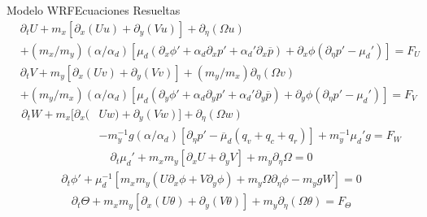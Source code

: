 \documentclass[mathserif,10pt]{beamer}
\begin{document}
\begin{frame}{Modelo WRF}{Ecuaciones Resueltas}
	\small
	\begin{equation}\begin{split}\label{eq:04_wrf1}
	&\partial_t U + m_x[\partial_x(Uu)+\partial_y(Vu)]+\partial_\eta(\Omega u) \\
	&+ (m_x/m_y)(\alpha/\alpha_d)[\mu_d(\partial_x\phi' + \alpha_d \partial_x p' + \alpha_d'\partial_x \overline p)+\partial_x\phi(\partial_\eta p' - \mu_d')] = F_U
	\end{split}\end{equation}
	\begin{equation}\begin{split}
	&\partial_t V + m_y[\partial_x(Uv)+\partial_y(Vv)]+(m_y/m_x)\partial_\eta(\Omega v) \\
	&+ (m_y/m_x)(\alpha/\alpha_d)[\mu_d(\partial_y\phi' + \alpha_d \partial_y p' + \alpha_d'\partial_y \overline p)+\partial_y\phi(\partial_\eta p' - \mu_d')] = F_V
	\end{split}\end{equation}
	\begin{equation}\begin{split}
	\partial_t W + m_x[\partial_x(&Uw)+\partial_y(Vw)]+\partial_\eta(\Omega w) \\
	\hspace{1cm}&- m_y^{-1}g(\alpha/\alpha_d)[\partial_\eta p' - \overline{\mu}_d(q_v+q_c+q_r)]+m_y^{-1}\mu_d' g = F_W
	\end{split}\end{equation}
	\begin{equation}\begin{split}
	\partial_t \mu_d' + m_x m_y[\partial_x U + \partial_y V] + m_y\partial_\eta \Omega = 0
	\end{split}\end{equation}
	\begin{equation}\begin{split}
	\partial_t \phi' + \mu_d^{-1}[m_x m_y(U\partial_x\phi + V\partial_y\phi) + m_y \Omega \partial_\eta\phi - m_ygW] = 0
	\end{split}\end{equation}
	\begin{equation}\begin{split}\label{eq:04_wrf2}
	\partial_t \Theta + m_x m_y [\partial_x(U\theta)+\partial_y(V\theta)]+m_y\partial_\eta(\Omega \theta) = F_\Theta
	\end{split}\end{equation}
\end{frame}
\end{document}
